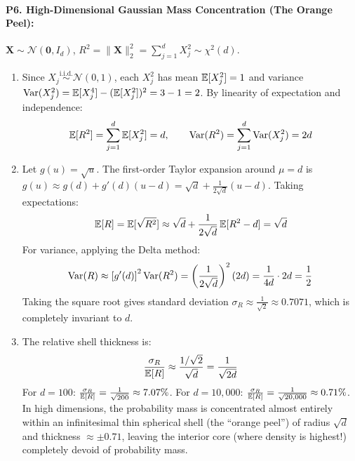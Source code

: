 \paragraph{P6. High-Dimensional Gaussian Mass Concentration (The Orange Peel):}
$\mathbf{X} \sim \mathcal{N}(\mathbf{0}, I_d)$, $R^2 = \|\mathbf{X}\|_2^2 = \sum_{j=1}^d X_j^2 \sim \chi^2(d)$.
\begin{enumerate}[label=(\alph*)]
    \item Since $X_j \stackrel{\text{i.i.d.}}{\sim} \mathcal{N}(0, 1)$, each $X_j^2$ has mean $\operatorname{\mathbb{E}}[X_j^2] = 1$ and variance $\operatorname{Var}(X_j^2) = \operatorname{\mathbb{E}}[X_j^4] - (\operatorname{\mathbb{E}}[X_j^2])^2 = 3 - 1 = 2$.
    By linearity of expectation and independence:
    \begin{equation*}
    \operatorname{\mathbb{E}}[R^2] = \sum_{j=1}^d \operatorname{\mathbb{E}}[X_j^2] = d, \qquad \operatorname{Var}(R^2) = \sum_{j=1}^d \operatorname{Var}(X_j^2) = 2d
    \end{equation*}
    \item Let $g(u) = \sqrt{u}$. The first-order Taylor expansion around $\mu = d$ is $g(u) \approx g(d) + g'(d)(u - d) = \sqrt{d} + \frac{1}{2\sqrt{d}}(u - d)$.
    Taking expectations:
    \begin{equation*}
    \operatorname{\mathbb{E}}[R] = \operatorname{\mathbb{E}}[\sqrt{R^2}] \approx \sqrt{d} + \frac{1}{2\sqrt{d}}\operatorname{\mathbb{E}}[R^2 - d] = \sqrt{d}
    \end{equation*}
    For variance, applying the Delta method:
    \begin{equation*}
    \operatorname{Var}(R) \approx \left[ g'(d) \right]^2 \operatorname{Var}(R^2) = \left( \frac{1}{2\sqrt{d}} \right)^2 (2d) = \frac{1}{4d} \cdot 2d = \frac{1}{2}
    \end{equation*}
    Taking the square root gives standard deviation $\sigma_R \approx \frac{1}{\sqrt{2}} \approx 0.7071$, which is completely invariant to $d$.
    \item The relative shell thickness is:
    \begin{equation*}
    \frac{\sigma_R}{\operatorname{\mathbb{E}}[R]} \approx \frac{1/\sqrt{2}}{\sqrt{d}} = \frac{1}{\sqrt{2d}}
    \end{equation*}
    For $d = 100$: $\frac{\sigma_R}{\operatorname{\mathbb{E}}[R]} = \frac{1}{\sqrt{200}} \approx 7.07\%$.
    For $d = 10{,}000$: $\frac{\sigma_R}{\operatorname{\mathbb{E}}[R]} = \frac{1}{\sqrt{20{,}000}} \approx 0.71\%$.
    In high dimensions, the probability mass is concentrated almost entirely within an infinitesimal thin spherical shell (the ``orange peel'') of radius $\sqrt{d}$ and thickness $\approx \pm 0.71$, leaving the interior core (where density is highest!) completely devoid of probability mass.
\end{enumerate}

